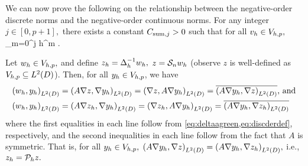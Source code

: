

We can now prove the following  on the relationship between the negative-order discrete norms and the negative-order continuous norms.
\label{lem:negdiscsum}
For any integer $j \in [0,p+1],$ there exists a constant $C_{\mathrm{sum},j} > 0$ such that for all $v_{h} \in V_{h,p},$
\beqs
\Nmjh{\vh} \leq \Csumj \sum_{m=0}^j h^{m} .
\eeqs
\ele

Let $w_{h} \in V_{h,p},$ and define $z_{h} = \Delta_{h}^{-1} w_{h},$ $z = \mathcal S_{n} w_{h}$ (observe $z$ is well-defined as $\Vhp \subseteq \LtD$). Then, for all $y_{h} \in V_{h,p}$, we have
\begin{align*}
\IPLtD{\wh}{\yh} &= \IPLtD{A \grad z}{\grad \yh} = \IPLtD{\grad z}{A\grad \yh} = \overline{\IPLtD{A\grad \yh}{\grad z}} \text{, and}\\
\IPLtD{\wh}{\yh} &= \IPLtD{A \grad \zh}{\grad \yh} = \IPLtD{\grad \zh}{A\grad \yh} = \overline{\IPLtD{A\grad \yh}{\grad \zh}}
\end{align*}
where the first equalities in each line follow from \cref{eq:deltaagreen,eq:discderdef}, respectively, and the second inequalities in each line follow from the fact that $A$ is symmetric. That is, for all $y_{h} \in V_{h,p},$ $\IPLtD{A\grad \yh}{\grad z} = \IPLtD{A\grad \yh}{\grad \zh},$ i.e., $z_{h} = \mathcal P_{h} z.$

